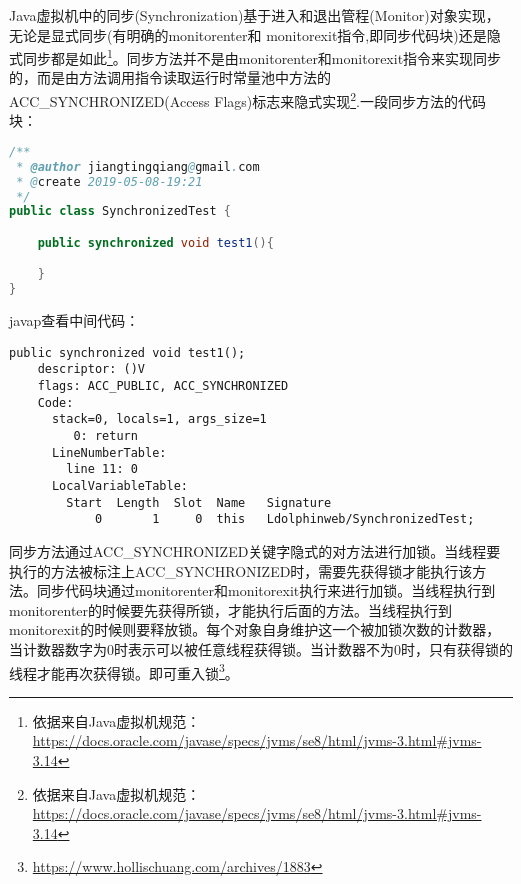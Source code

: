 \documentclass[../../../interview-questions.tex]{subfiles}
\begin{document}
Java虚拟机中的同步(Synchronization)基于进入和退出管程(Monitor)对象实现，无论是显式同步(有明确的monitorenter和 monitorexit指令,即同步代码块)还是隐式同步都是如此\footnote{依据来自Java虚拟机规范：\url{https://docs.oracle.com/javase/specs/jvms/se8/html/jvms-3.html\#jvms-3.14}}。同步方法并不是由monitorenter和monitorexit指令来实现同步的，而是由方法调用指令读取运行时常量池中方法的ACC\_SYNCHRONIZED(Access Flags)标志来隐式实现\footnote{依据来自Java虚拟机规范：\url{https://docs.oracle.com/javase/specs/jvms/se8/html/jvms-3.html\#jvms-3.14}}.一段同步方法的代码块：

\begin{lstlisting}[language=Java]
/**
 * @author jiangtingqiang@gmail.com
 * @create 2019-05-08-19:21
 */
public class SynchronizedTest {

    public synchronized void test1(){

    }
}
\end{lstlisting}

javap查看中间代码：

\begin{lstlisting}
public synchronized void test1();
    descriptor: ()V
    flags: ACC_PUBLIC, ACC_SYNCHRONIZED
    Code:
      stack=0, locals=1, args_size=1
         0: return
      LineNumberTable:
        line 11: 0
      LocalVariableTable:
        Start  Length  Slot  Name   Signature
            0       1     0  this   Ldolphinweb/SynchronizedTest;
\end{lstlisting}

同步方法通过ACC\_SYNCHRONIZED关键字隐式的对方法进行加锁。当线程要执行的方法被标注上ACC\_SYNCHRONIZED时，需要先获得锁才能执行该方法。同步代码块通过monitorenter和monitorexit执行来进行加锁。当线程执行到monitorenter的时候要先获得所锁，才能执行后面的方法。当线程执行到monitorexit的时候则要释放锁。每个对象自身维护这一个被加锁次数的计数器，当计数器数字为0时表示可以被任意线程获得锁。当计数器不为0时，只有获得锁的线程才能再次获得锁。即可重入锁\footnote{\url{https://www.hollischuang.com/archives/1883}}。
\end{document}
